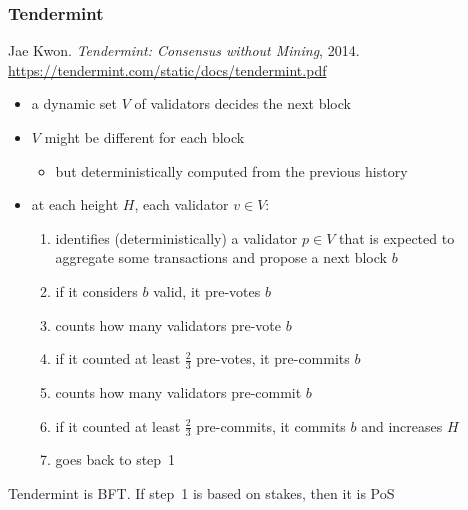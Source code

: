 \documentclass[11pt]{beamer}  %
\begin{document}
\begin{frame}\frametitle{Tendermint}

  \begin{greenbox}{Jae Kwon. \emph{Tendermint: Consensus without Mining}, 2014.\\
    \url{https://tendermint.com/static/docs/tendermint.pdf}}
    \begin{itemize}
    \item a dynamic set $V$ of validators decides the next block
    \item $V$ might be different for each block
      \begin{itemize}
      \item but deterministically computed from the previous history
      \end{itemize}
    \item at each height $H$, each validator $v\in V$:
      \begin{enumerate}
      \item identifies (deterministically) a validator $p\in V$ that
        is expected to aggregate some transactions and \alert{propose} a next block $b$
      \item if it considers $b$ valid, it \alert{pre-votes} $b$
      \item counts how many validators pre-vote $b$
      \item if it counted at least $\frac{2}{3}$ pre-votes, it \alert{pre-commits} $b$
      \item counts how many validators pre-commit $b$
      \item if it counted at least $\frac{2}{3}$ pre-commits, it \alert{commits} $b$ and increases $H$
      \item goes back to step~1
      \end{enumerate}
    \end{itemize}
  \end{greenbox}

  \smallskip

  \begin{center}
    Tendermint is BFT. If step~1 is based on stakes, then it is PoS
  \end{center}

\end{frame}
\end{document}
